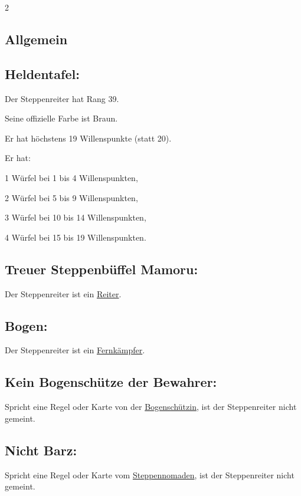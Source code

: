 \documentclass[10pt, a4paper, oneside]{book}
\begin{document}
\begin{multicols*}{2}\raggedcolumns

\begin{nobgcolor}

\section{Allgemein}

\subsection{Heldentafel:}

Der Steppenreiter hat Rang 39.

Seine offizielle Farbe ist Braun.

Er hat höchstens 19 Willenspunkte (statt 20).

Er hat:

\bullet{} 1 Würfel bei 1 bis 4 Willenspunkten,

\bullet{} 2 Würfel bei 5 bis 9 Willenspunkten,

\bullet{} 3 Würfel bei 10 bis 14 Willenspunkten,

\bullet{} 4 Würfel bei 15 bis 19 Willenspunkten.






\subsection{Treuer Steppenbüffel Mamoru:}

Der Steppenreiter ist ein \hyperref[reiter]{Reiter}.







\subsection{Bogen:}

Der Steppenreiter ist ein \hyperref[fernkaempfer]{Fernkämpfer}.




\subsection{Kein Bogenschütze der Bewahrer:}

Spricht eine Regel oder Karte von der \hyperref[bogenschuetzin]{Bogenschützin}, ist der Steppenreiter nicht gemeint.


\subsection{Nicht Barz:}

Spricht eine Regel oder Karte vom \hyperref[steppennomade]{Steppennomaden}, ist der Steppenreiter nicht gemeint.



\end{nobgcolor}



\end{multicols*}
\end{document}
